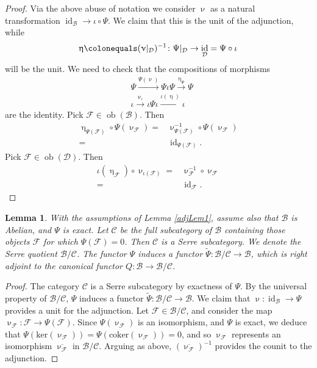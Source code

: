 \documentclass[a4paper,10pt]{amsart}
\renewcommand{\nu}{\upnu}
\renewcommand{\eta}{\upeta}
\newtheorem{lemma}[theorem]{Lemma}
\DeclareMathOperator{\obj}{ob}
\DeclareMathOperator{\id}{id}
\begin{document}
\begin{proof}
Via the above abuse of notation we consider $\nu$ as a natural transformation $\id_{\mathcal{B}}\rightarrow \iota\circ\Psi$.  We claim that this is the unit of the adjunction, while
\[
\eta\colonequals(\nu|_{\mathcal{D}})^{-1}\colon \Psi|_{\mathcal{D}}\rightarrow \id_{\mathcal{D}}=\Psi\circ\iota
\]
will be the unit.  We need to check that the compositions of morphisms
\begin{align}
\label{cua1}
&\Psi\xrightarrow{\Psi(\nu)}\Psi\iota\Psi\xrightarrow{\eta_{\Psi}}\Psi\\
\label{cua2}
&\iota\xrightarrow{\nu_{\iota}}\iota\Psi\iota\xrightarrow{\iota(\eta)}\iota
\end{align}
are the identity.  Pick $\mathcal{F}\in\obj(\mathcal{B})$.  Then 
\begin{align*}
\eta_{\Psi(\mathcal{F})}\circ\Psi(\nu_{\mathcal{F}})=&\nu_{\Psi(\mathcal{F})}^{-1}\circ\Psi(\nu_{\mathcal{F}})\\=&\id_{\Psi(\mathcal{F})}.
\end{align*}
Pick $\mathcal{F}\in\obj(\mathcal{D})$.  Then
\begin{align*}
\iota(\eta_{\mathcal{F}})\circ \nu_{\iota(\mathcal{F})}=&\nu_{\mathcal{F}}^{-1}\circ \nu_{\mathcal{F}}\\=&\id_{\mathcal{F}}.
\end{align*}
\end{proof}
\begin{lemma}
\label{adjLem2}
With the assumptions of Lemma \ref{adjLem1}, assume also that $\mathcal{B}$ is Abelian, and $\Psi$ is exact.  Let $\mathcal{C}$ be the full subcategory of $\mathcal{B}$ containing those objects $\mathcal{F}$ for which $\Psi(\mathcal{F})=0$.  Then $\mathcal{C}$ is a Serre subcategory.  We denote the Serre quotient $\mathcal{B}/\mathcal{C}$.  The functor $\Psi$ induces a functor $\tilde{\Psi}\colon\mathcal{B}/\mathcal{C}\rightarrow \mathcal{B}$, which is right adjoint to the canonical functor $Q\colon \mathcal{B}\rightarrow\mathcal{B}/\mathcal{C}$.
\end{lemma}
\begin{proof}
The category $\mathcal{C}$ is a Serre subcategory by exactness of $\Psi$.  By the universal property of $\mathcal{B}/\mathcal{C}$, $\Psi$ induces a functor $\tilde{\Psi}\colon\mathcal{B}/\mathcal{C}\rightarrow \mathcal{B}$.  We claim that $\nu\colon \id_{\mathcal{B}}\rightarrow \Psi$ provides a unit for the adjunction.  Let $\mathcal{F}\in\mathcal{B}/\mathcal{C}$, and consider the map $\nu_{\mathcal{F}}\colon\mathcal{F}\rightarrow \Psi(\mathcal{F})$.  Since $\Psi(\nu_{\mathcal{F}})$ is an isomorphism, and $\Psi$ is exact, we deduce that $\Psi(\mathrm{ker}(\nu_{\mathcal{F}}))=\Psi(\mathrm{coker}(\nu_{\mathcal{F}}))=0$, and so $\nu_{\mathcal{F}}$ represents an isomorphism $\overline{\nu_{\mathcal{F}}}$ in $\mathcal{B}/\mathcal{C}$.  Arguing as above, $(\overline{\nu_{\mathcal{F}}})^{-1}$ provides the counit to the adjunction.
\end{proof}
\end{document}
